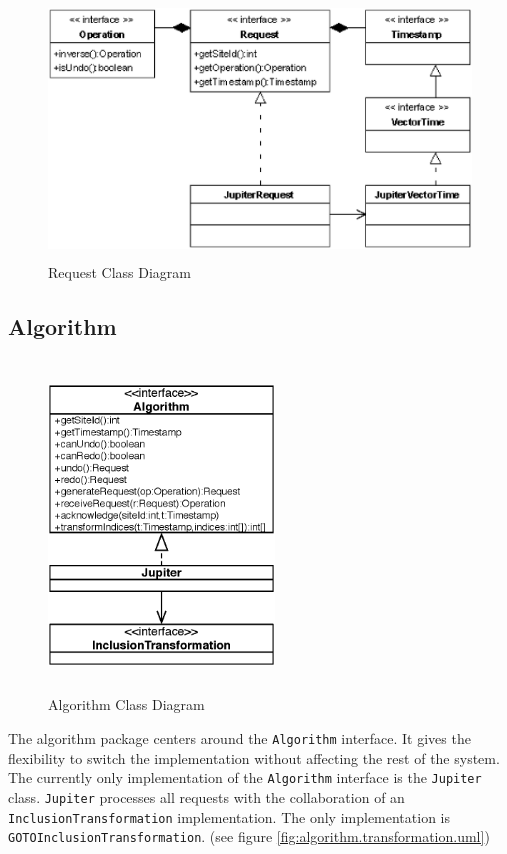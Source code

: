 \begin{figure}[H]
\centering
\includegraphics[height=6.87cm,width=12.09cm]{../images/finalreport/algorithm_request.eps}
\caption{Request Class Diagram}
\label{Request Class Diagram}
\end{figure}


\subsection{Algorithm}

\begin{figure}[H]
\centering
\includegraphics[width=6cm,height=8.78cm]{../images/finalreport/algorithm.eps}
\caption{Algorithm Class Diagram}
\label{fig:algorithm.uml}
\end{figure}

The algorithm package centers around the \texttt{Algorithm} interface.
It gives the flexibility to switch the implementation without affecting the 
rest of the system. The currently only implementation of the \texttt{Algorithm} 
interface is the \texttt{Jupiter} class. \texttt{Jupiter} processes 
all requests with the collaboration of an \texttt{InclusionTransformation}
implementation. The only implementation is \texttt{GOTOInclusionTransformation}. (see figure \ref{fig:algorithm.transformation.uml})

